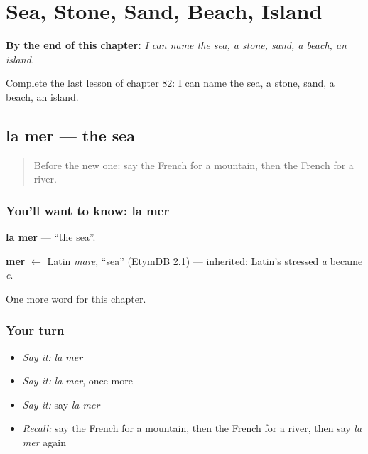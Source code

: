 
\chapter{Sea, Stone, Sand, Beach, Island}
\label{ch:fr-sea-stone-sand-beach-island}

\begin{chapteropening}
\textbf{By the end of this chapter:} \emph{I can name the sea, a stone, sand, a beach, an island.}

Complete the last lesson of chapter 82: I can name the sea, a stone, sand, a beach, an island.
\end{chapteropening}

\section[la mer]{la mer — the sea}

\label{lesson:FR-C82-mer}



\begin{quote}
Before the new one: say the French for a mountain, then the French for a river.
\end{quote}

\subsection*{You'll want to know: la mer}
\textbf{la mer} — \textquotedblleft{}the sea\textquotedblright{}.

\begin{cousinweb}
\textbf{mer} $\leftarrow$ Latin \emph{mare}, \textquotedblleft{}sea\textquotedblright{} (EtymDB 2.1) — inherited: Latin's stressed \emph{a} became \emph{e}.
\end{cousinweb}

\begin{grammarlens}[title={What you've built}]
One more word for this chapter.
\end{grammarlens}

\subsection*{Your turn}
\begin{itemize}
\raggedright
  \item \emph{Say it:} \emph{la mer}
  \item \emph{Say it:} \emph{la mer}, once more
  \item \emph{Say it:} say \emph{la mer}
  \item \emph{Recall:} say the French for a mountain, then the French for a river, then say \emph{la mer} again
\end{itemize}

